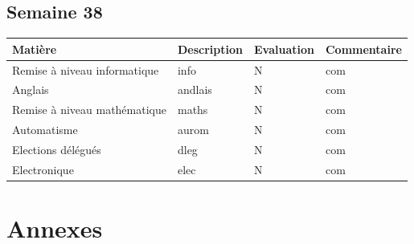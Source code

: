 \documentclass[12pt, openany]{report}
\begin{document}
\section*{Semaine 38}
\begin{tabular}{|l|l|l|l|}
\hline
Matière & Description & Evaluation & Commentaire \\ 
\hline
Remise à niveau informatique & info & N & com \\ 
\hline
Anglais & andlais & N & com \\ 
\hline
Remise à niveau mathématique & maths & N & com \\ 
\hline
Automatisme & aurom & N & com \\ 
\hline
Elections délégués & dleg & N & com \\ 
\hline
Electronique & elec & N & com \\ 
\hline
\end{tabular}

\chapter{Annexes}


\end{document}

